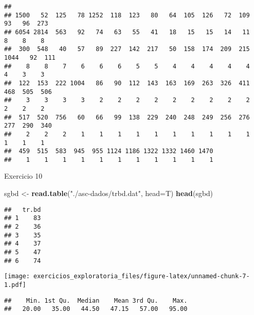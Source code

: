 \documentclass[
]{article}
\newenvironment{Shaded}{\begin{snugshade}}{\end{snugshade}}
\newcommand{\AttributeTok}[1]{\textcolor[rgb]{0.13,0.29,0.53}{#1}}
\newcommand{\FunctionTok}[1]{\textcolor[rgb]{0.13,0.29,0.53}{\textbf{#1}}}
\newcommand{\NormalTok}[1]{#1}
\newcommand{\OtherTok}[1]{\textcolor[rgb]{0.56,0.35,0.01}{#1}}
\newcommand{\SpecialCharTok}[1]{\textcolor[rgb]{0.81,0.36,0.00}{\textbf{#1}}}
\newcommand{\StringTok}[1]{\textcolor[rgb]{0.31,0.60,0.02}{#1}}
\begin{document}
\begin{verbatim}
## 
## 1500   52  125   78 1252  118  123   80   64  105  126   72  109   93   96  273 
## 6054 2814  563   92   74   63   55   41   18   15   15   14   11    8    8    8 
##  300  548   40   57   89  227  142  217   50  158  174  209  215 1044   92  111 
##    8    8    7    6    6    6    5    5    4    4    4    4    4    4    3    3 
##  122  153  222 1004   86   90  112  143  163  169  263  326  411  468  505  506 
##    3    3    3    3    2    2    2    2    2    2    2    2    2    2    2    2 
##  517  520  756   60   66   99  138  229  240  248  249  256  276  277  290  340 
##    2    2    2    1    1    1    1    1    1    1    1    1    1    1    1    1 
##  459  515  583  945  955 1124 1186 1322 1332 1460 1470 
##    1    1    1    1    1    1    1    1    1    1    1
\end{verbatim}

Exercicio 10

\begin{Shaded}
\begin{Highlighting}[]
\NormalTok{sgbd }\OtherTok{\textless{}{-}} \FunctionTok{read.table}\NormalTok{(}\StringTok{"./asc{-}dados/trbd.dat"}\NormalTok{, }\AttributeTok{head=}\NormalTok{T)}
\FunctionTok{head}\NormalTok{(sgbd)}
\end{Highlighting}
\end{Shaded}

\begin{verbatim}
##   tr.bd
## 1    83
## 2    36
## 3    35
## 4    37
## 5    47
## 6    74
\end{verbatim}

\begin{Shaded}
\end{Shaded}

\texttt{[image: exercicios\_exploratoria\_files/figure-latex/unnamed-chunk-7-1.pdf]}

\begin{Shaded}
\end{Shaded}

\begin{verbatim}
##    Min. 1st Qu.  Median    Mean 3rd Qu.    Max. 
##   20.00   35.00   44.50   47.15   57.00   95.00
\end{verbatim}
\end{document}

